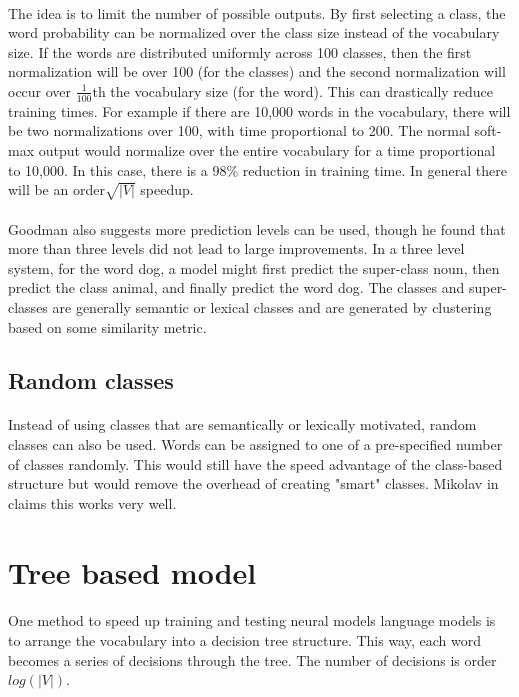\documentclass[12pt]{ociamthesis}
\begin{document}
\paragraph{}
The idea is to limit the number of possible outputs. By first selecting a class, the word probability can be normalized over the class size instead of the vocabulary size. If the words are distributed uniformly across 100 classes, then the first normalization will be over 100 (for the classes) and the second normalization will occur over $\frac{1}{100}$th the vocabulary size (for the word). This can drastically reduce training times. For example if there are 10,000 words in the vocabulary, there will be two normalizations over 100, with time proportional to 200. The normal soft-max output would normalize over the entire vocabulary for a time proportional to 10,000. In this case, there is a 98\% reduction in training time. In general there will be an order$\sqrt{|V|}$ speedup.
\paragraph{}
Goodman also suggests more prediction levels can be used, though he found that more than three levels did not lead to large improvements. In a three level system, for the word dog, a model might first predict the super-class noun, then predict the class animal, and finally predict the word dog. The classes and super-classes are generally semantic or lexical classes and are generated by clustering based on some similarity metric.
\subsection{Random classes}
\paragraph{}
Instead of using classes that are semantically or lexically motivated, random classes can also be used. Words can be assigned to one of a pre-specified number of classes randomly. This would still have the speed advantage of the class-based structure but would remove the overhead of creating "smart" classes. Mikolav in \cite{?} claims this works very well. 

\section{Tree based model}
\paragraph{}
One method to speed up training and testing neural models language models is to arrange the vocabulary into a decision tree structure. This way, each word becomes a series of decisions through the tree. The number of decisions is order $log(|V|)$.
\end{document}
